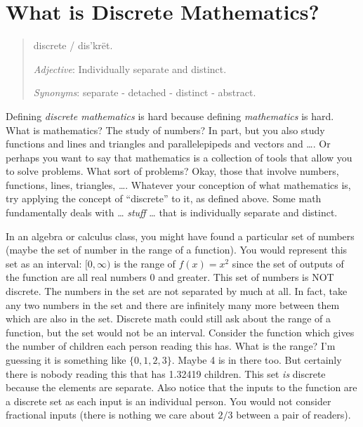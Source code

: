 \documentclass[10pt,]{book}
\theoremstyle{plain}
\theoremstyle{definition}
\theoremstyle{definition}
\theoremstyle{definition}
\numberwithin{equation}{section}
\begin{document}
\section[What is Discrete Mathematics?]{What is Discrete Mathematics?}\label{sec_intro-intro}
\begin{quote}dis\textperiodcentered{}crete / dis'krët.%
\par
 \emph{Adjective}: Individually separate and distinct.%
\par
\emph{Synonyms}: separate - detached - distinct - abstract.%
\end{quote}

    Defining \emph{discrete mathematics} is hard because defining \emph{mathematics} is hard. What is mathematics? The study of numbers? In part, but you also study functions and lines and triangles and parallelepipeds and vectors and
    \dots{}. Or perhaps you want to say that mathematics is a collection of tools that allow you to solve problems. What sort of problems? Okay, those that involve numbers, functions, lines, triangles,
    \dots{}. Whatever your conception of what mathematics is, try applying the concept of ``discrete'' to it, as defined above. Some math fundamentally deals with
    \dots{} \emph{stuff}
    \dots{} that is individually separate and distinct.
\par

    In an algebra or calculus class, you might have found a particular set of numbers (maybe the set of number in the range of a function). You would represent this set as an interval: \([0,\infty)\) is the range of \(f(x) = x^2\) since the set
    of outputs of the function are all real numbers 0 and greater. This set of numbers is NOT discrete. The numbers in the set are not separated by much at all. In fact, take any two numbers in the set and there are infinitely many more between
    them which are also in the set. Discrete math could still ask about the range of a function, but the set would not be an interval. Consider the function which gives the number of children each person reading this has. What is the range? I'm guessing
    it is something like \(\{0, 1, 2, 3\}\). Maybe 4 is in there too. But certainly there is nobody reading this that has 1.32419 children. This set \emph{is} discrete because the elements are separate. Also notice that the inputs to the function
    are a discrete set as each input is an individual person. You would not consider fractional inputs (there is nothing we care about \(2/3\) between a pair of readers).
\par
\end{document}
